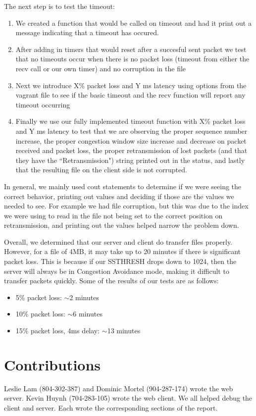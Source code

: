 \documentclass{article}
\begin{document}
    The next step is to test the timeout:
    \begin{enumerate}
        \item We created a function that would be called on timeout and
            had it print out a message indicating that a timeout has occured.
        \item After adding in timers that would reset after a succesful sent
            packet we test that no timeouts occur when there is no packet loss
            (timeout from either the recv call or our own timer) and no
            corruption in the file
        \item Next we introduce X\% packet loss and Y ms latency using
            options from the vagrant file to see if the basic timeout and 
            the recv function will report any timeout occurring 
        \item Finally we use our fully implemented timeout function with X\% 
            packet loss and Y ms latency to test that we are observing the
            proper sequence number increase, the proper congestion window size
            increase and decrease on packet received and packet loss, the
            proper retransmission of lost packets (and that they have the
            ``Retransmission") string printed out in the status, and lastly
            that the resulting file on the client side is not corrupted.
    \end{enumerate}

    In general, we mainly used cout statements to determine if we were seeing
    the correct behavior, printing out values and deciding if those are the
    values we needed to see.  For example we had file corruption, but this was
    due to the index we were using to read in the file not being set to the
    correct position on retransmission, and printing out the values helped
    narrow the problem down.

    Overall, we determined that our server and client do transfer files
    properly. However, for a file of 4MB, it may take up to 20 minutes if there
    is significant packet loss. This is because if our SSTHRESH drops down to
    1024, then the server will always be in Congestion Avoidance mode, making
    it difficult to transfer packets quickly. Some of the results of our tests
    are as follows:
    \begin{itemize}
        \item 5\% packet loss: $\sim$2 minutes
        \item 10\% packet loss: $\sim$6 minutes
        \item 15\% packet loss, 4ms delay: $\sim$13 minutes
    \end{itemize}

\section{Contributions}
    Leslie Lam (804-302-387) and Dominic Mortel (904-287-174) wrote the web
    server. Kevin Huynh (704-283-105) wrote the web client. We all helped debug
    the client and server. Each wrote the corresponding sections of the report.
\end{document}
